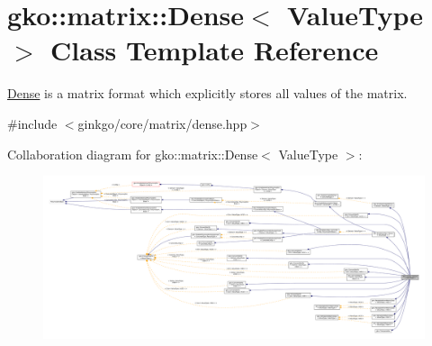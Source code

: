 \hypertarget{classgko_1_1matrix_1_1Dense}{}\section{gko\+:\+:matrix\+:\+:Dense$<$ Value\+Type $>$ Class Template Reference}
\label{classgko_1_1matrix_1_1Dense}


\hyperlink{classgko_1_1matrix_1_1Dense}{Dense} is a matrix format which explicitly stores all values of the matrix.  




{\ttfamily \#include $<$ginkgo/core/matrix/dense.\+hpp$>$}



Collaboration diagram for gko\+:\+:matrix\+:\+:Dense$<$ Value\+Type $>$\+:
\nopagebreak
\begin{figure}[H]
\begin{center}
\leavevmode
\includegraphics[width=350pt]{classgko_1_1matrix_1_1Dense__coll__graph}
\end{center}
\end{figure}
